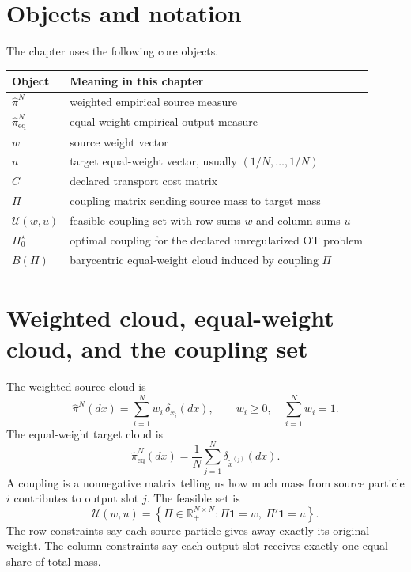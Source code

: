 \section{Objects and notation}
\label{sec:bf-ot-baseline-objects}

The chapter uses the following core objects.

\begin{center}
\small
\begin{tabular}{p{} p{}}
\toprule
Object & Meaning in this chapter \\
\midrule
$\hat\pi^N$ & weighted empirical source measure \\
$\hat\pi^N_{\mathrm{eq}}$ & equal-weight empirical output measure \\
$w$ & source weight vector \\
$u$ & target equal-weight vector, usually $(1/N,\ldots,1/N)$ \\
$C$ & declared transport cost matrix \\
$\Pi$ & coupling matrix sending source mass to target mass \\
$\mathcal U(w,u)$ & feasible coupling set with row sums $w$ and column sums $u$ \\
$\Pi_0^\star$ & optimal coupling for the declared unregularized OT problem \\
$B(\Pi)$ & barycentric equal-weight cloud induced by coupling $\Pi$ \\
\bottomrule
\end{tabular}
\end{center}

\section{Weighted cloud, equal-weight cloud, and the coupling set}
\label{sec:bf-ot-baseline-coupling}

The weighted source cloud is
\begin{equation}
\label{eq:bf-ot-baseline-weighted-measure}
  \hat\pi^N(dx)
  =
  \sum_{i=1}^N w_i\,\delta_{x_i}(dx),
  \qquad
  w_i\ge0,
  \quad
  \sum_{i=1}^N w_i=1.
\end{equation}
The equal-weight target cloud is
\begin{equation}
\label{eq:bf-ot-baseline-equal-measure}
  \hat\pi^N_{\mathrm{eq}}(dx)
  =
  \frac{1}{N}
  \sum_{j=1}^N \delta_{\tilde x^{(j)}}(dx).
\end{equation}
A coupling is a nonnegative matrix telling us how much mass from source particle
\(i\) contributes to output slot \(j\).  The feasible set is
\begin{equation}
\label{eq:bf-ot-baseline-feasible-set}
  \mathcal U(w,u)
  =
  \left\{
    \Pi\in\mathbb R_+^{N\times N}:
    \Pi\mathbf 1=w,
    \ \Pi'\mathbf 1=u
  \right\}.
\end{equation}
The row constraints say each source particle gives away exactly its original
weight.  The column constraints say each output slot receives exactly one equal
share of total mass.

